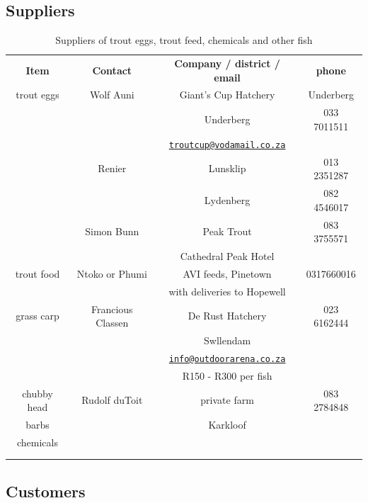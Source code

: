 \begin{appendices}
\subsection{Suppliers}

\begin{table}[H]
  \centering
  \begin{tabular}{|c|c|c|c|}
    \thickhline
    {\bf Item} & {\bf Contact} & {\bf Company / district / email} & {\bf phone}  \\ \thickhline
    trout eggs & Wolf Auni & Giant's Cup Hatchery & Underberg \\
              &  & Underberg & 033 7011511 \\
              &  & \href{mailto:troutcup@vodamail.co.za}{\nolinkurl{troutcup@vodamail.co.za}} 
              &    \\ \hline
              & Renier & Lunsklip & 013 2351287 \\
              & &  Lydenberg  & 082 4546017  \\ \hline
              & Simon Bunn & Peak Trout &  083 3755571 \\
              & & Cathedral Peak Hotel  & \\ \hline
   trout food &  Ntoko or Phumi      &  AVI feeds, Pinetown &  0317660016    \\
              &  &   with deliveries to Hopewell  &  \\ \hline
   grass carp & Francious Classen & De Rust Hatchery & 023 6162444 \\
                    & & Swllendam & \\
                    & &  \href{mailto:info@outdoorarena.co.za}{\nolinkurl{info@outdoorarena.co.za}} 
                    &  \\ 
                    & & R150 - R300 per fish &  \\ \hline
    chubby head  & Rudolf duToit & private farm & 083 2784848 \\
    barbs   & &  Karkloof &  \\ \hline
    chemicals &  &  &  \\
              &   &   & \\ \hline
              \thickhline
  \end{tabular} 
   \caption{Suppliers of trout eggs, trout feed, chemicals and other fish}
 
  \label{tab:SupplierContactDetails}
\end{table}

\subsection{Customers}


\end{appendices}
